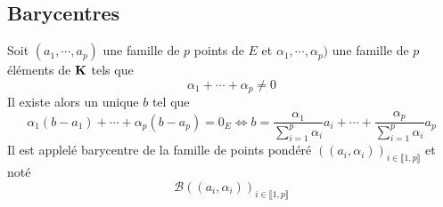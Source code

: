 \subsection{Barycentres}
\begin{prop}
  Soit $(a_1,\cdots,a_p)$ une famille de $p$ points de $E$ et $\alpha_1,\cdots,\alpha_p)$ une famille de $p$ éléments de $\mathbf{K}$ tels que 
\begin{displaymath}
  \alpha_1 + \cdots + \alpha_p \neq 0
\end{displaymath}
Il existe alors un unique $b$ tel que 
\begin{displaymath}
  \alpha_1(b-a_1) + \cdots + \alpha_p(b-a_p) = 0_E 
  \Leftrightarrow b = \frac{\alpha_1}{\sum_{i=1}^p\alpha_i}a_i + \cdots + \frac{\alpha_p}{\sum_{i=1}^p\alpha_i}a_p
\end{displaymath}
Il est applelé barycentre de la famille de points pondéré $((a_i,\alpha_i))_{i\in\llbracket 1,p \rrbracket}$ et noté 
\begin{displaymath}
  \mathcal{B}((a_i,\alpha_i))_{i\in\llbracket 1,p \rrbracket}
\end{displaymath}
\end{prop}

